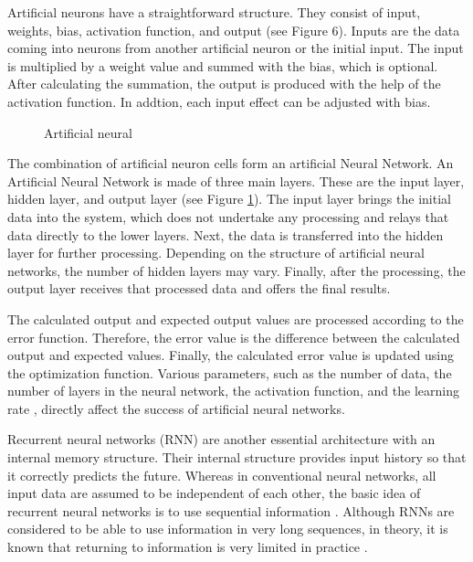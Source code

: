 Artificial neurons have a straightforward structure. They consist of input, weights, bias, activation function, and output (see Figure 6). Inputs are the data coming into neurons from another artificial neuron or the initial input. The input is multiplied by a weight value and summed with the bias, which is optional. After calculating the summation, the output is produced with the help of the activation function. In addtion, each input effect can be adjusted with bias.

\begin{figure}[htbp]
\centering
{}
\caption{Artificial neural \cite{bre2018prediction}}
\label{fig:MethodologyArtificialNeuralNetwork}
\end{figure}

The combination of artificial neuron cells form an artificial Neural Network. An Artificial Neural Network is made of three main layers. These are the input layer, hidden layer, and output layer (see Figure \ref{fig:MethodologyArtificialNeuralNetwork}). The input layer brings the initial data into the system, which does not undertake any processing and relays that data directly to the lower layers. Next, the data is transferred into the hidden layer for further processing. Depending on the structure of artificial neural networks, the number of hidden layers may vary. Finally, after the processing, the output layer receives that processed data and offers the final results. 

The calculated output and expected output values are processed according to the error function. Therefore, the error value is the difference between the calculated output and expected values. Finally, the calculated error value is updated using the optimization function. Various parameters, such as the number of data, the number of layers in the neural network, the activation function, and the learning rate \cite{goodfellow2016deep}, directly affect the success of artificial neural networks.

Recurrent neural networks (RNN) are another essential architecture with an internal memory structure. Their internal structure provides input history so that it correctly predicts the future. Whereas in conventional neural networks, all input data are assumed to be independent of each other, the basic idea of recurrent neural networks is to use sequential information \cite{medsker1999recurrent}. Although RNNs are considered to be able to use information in very long sequences, in theory, it is known that returning to information is very limited in practice \cite{medsker1999recurrent}.

